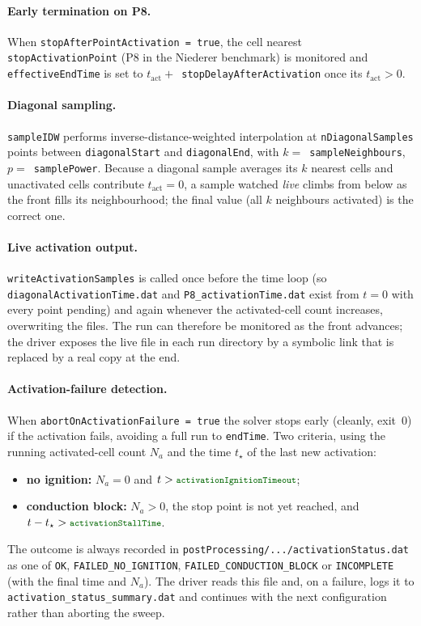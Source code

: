 \documentclass[11pt,a4paper]{article}
\newcommand{\code}[1]{\texttt{\small #1}}
\newcommand{\dictkey}[1]{\textcolor{black!60!green}{\texttt{\footnotesize #1}}}
\begin{document}
\paragraph{Early termination on P8.}
When \code{stopAfterPointActivation = true}, the cell nearest
\code{stopActivationPoint} (P8 in the Niederer benchmark) is monitored
and \code{effectiveEndTime} is set to $t_{\text{act}} +
$~\code{stopDelayAfterActivation} once its $t_{\text{act}} > 0$.

\paragraph{Diagonal sampling.}
\code{sampleIDW} performs inverse-distance-weighted interpolation at
\code{nDiagonalSamples} points between \code{diagonalStart} and
\code{diagonalEnd}, with $k = $~\code{sampleNeighbours},
$p = $~\code{samplePower}. Because a diagonal sample averages its $k$ nearest
cells and unactivated cells contribute $t_{\text{act}}=0$, a sample watched
\emph{live} climbs from below as the front fills its neighbourhood; the final
value (all $k$ neighbours activated) is the correct one.

\paragraph{Live activation output.}
\code{writeActivationSamples} is called once before the time loop (so
\code{diagonalActivationTime.dat} and \code{P8\_activationTime.dat} exist from
$t=0$ with every point pending) and again whenever the activated-cell count
increases, overwriting the files. The run can therefore be monitored as the
front advances; the driver exposes the live file in each run directory by a
symbolic link that is replaced by a real copy at the end.

\paragraph{Activation-failure detection.}
When \dictkey{abortOnActivationFailure = true} the solver stops early
(cleanly, exit~0) if the activation fails, avoiding a full run to
\code{endTime}. Two criteria, using the running activated-cell count $N_a$ and
the time $t_\star$ of the last new activation:
\begin{itemize}[topsep=2pt,itemsep=1pt]
  \item \textbf{no ignition:} $N_a=0$ and
        $t>\dictkey{activationIgnitionTimeout}$;
  \item \textbf{conduction block:} $N_a>0$, the stop point is not yet reached,
        and $t-t_\star>\dictkey{activationStallTime}$.
\end{itemize}
The outcome is always recorded in
\code{postProcessing/.../activationStatus.dat} as one of \code{OK},
\code{FAILED\_NO\_IGNITION}, \code{FAILED\_CONDUCTION\_BLOCK} or
\code{INCOMPLETE} (with the final time and $N_a$). The driver reads this file
and, on a failure, logs it to \code{activation\_status\_summary.dat} and
continues with the next configuration rather than aborting the sweep.
\end{document}
